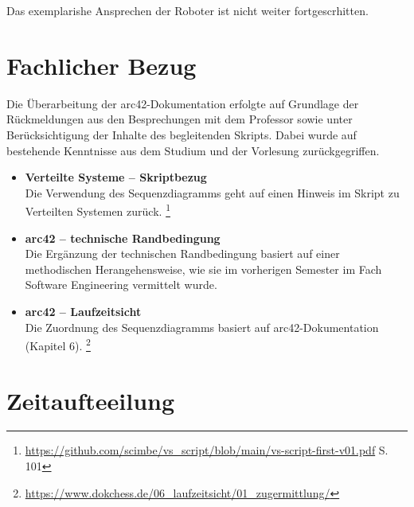 \documentclass{article}
\begin{document}
Das exemplarishe Ansprechen der Roboter ist nicht weiter fortgescrhitten.




\section{Fachlicher Bezug}

Die Überarbeitung der arc42-Dokumentation erfolgte auf Grundlage der Rückmeldungen aus den Besprechungen mit dem Professor sowie unter Berücksichtigung der Inhalte des begleitenden Skripts.  
Dabei wurde auf bestehende Kenntnisse aus dem Studium und der Vorlesung zurückgegriffen.

\begin{itemize}

\item \textbf{Verteilte Systeme – Skriptbezug} \\
Die Verwendung des Sequenzdiagramms geht auf einen Hinweis im Skript zu Verteilten Systemen zurück.
\footnote{\url{https://github.com/scimbe/vs_script/blob/main/vs-script-first-v01.pdf} S. 101 }
\item \textbf{arc42 – technische Randbedingung} \\
Die Ergänzung der technischen Randbedingung basiert auf einer methodischen Herangehensweise, wie sie im vorherigen Semester im Fach Software Engineering vermittelt wurde.
\item \textbf{arc42 – Laufzeitsicht} \\
Die Zuordnung des Sequenzdiagramms basiert auf arc42-Dokumentation (Kapitel 6). 
\footnote {\url{https://www.dokchess.de/06_laufzeitsicht/01_zugermittlung/}}


\end{itemize}

\clearpage
\section{Zeitaufteeilung}
\end{document}
